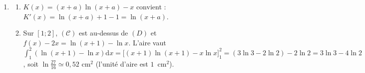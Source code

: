 \begin{corrige}
\begin{sol}
\begin{enumerate}
      $\alpha \in \left]-\frac{1}{2};-\frac{1}{4}\right[$ ($\alpha \simeq -0{,}34$).
\item \begin{enumerate}
      \item $K(x) = (x+a)\ln(x+a) - x$ convient : $K'(x) = \ln(x+a) + 1 - 1 = \ln(x+a)$.
      \item Sur $[1;2]$, $(\mathcal{C})$ est au-dessus de $(D)$ et $f(x) - 2x = \ln(x+1) - \ln x$. L'aire vaut
            $\int_1^2 \left(\ln(x+1) - \ln x\right) \mathrm{d}x = \Big[(x+1)\ln(x+1) - x\ln x\Big]_1^2 = (3\ln 3 - 2\ln 2) - 2\ln 2 = 3\ln 3 - 4\ln 2$,
            soit $\boxed{\ln\frac{27}{16} \simeq 0{,}52 \text{ cm}^2}$ (l'unit\'e d'aire est $1$~cm$^2$).
      \end{enumerate}
\end{enumerate}
\end{sol}


\end{corrige}
